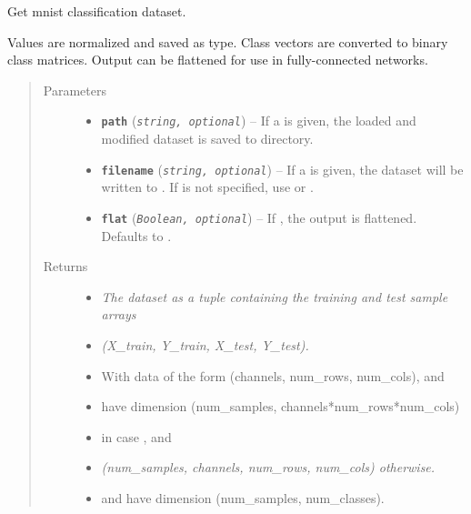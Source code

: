 \documentclass[letterpaper,10pt,english]{sphinxmanual}
\begin{document}
\begin{fulllineitems}
\label{snntoolbox.io_utils:snntoolbox.io_utils.mnist_load.get_mnist}
Get mnist classification dataset.

Values are normalized and saved as  type. Class vectors are
converted to binary class matrices. Output can be flattened for use in
fully-connected networks.
\begin{quote}\begin{description}
\item[{Parameters}] \leavevmode\begin{itemize}
\item {} 
\textbf{\texttt{path}} (\emph{\texttt{string, optional}}) -- If a  is given, the loaded and modified dataset is saved to
 directory.

\item {} 
\textbf{\texttt{filename}} (\emph{\texttt{string, optional}}) -- If a  is given, the dataset will be written to .
If  is not specified, use  or .

\item {} 
\textbf{\texttt{flat}} (\emph{\texttt{Boolean, optional}}) -- If , the output is flattened. Defaults to .

\end{itemize}

\item[{Returns}] \leavevmode
\begin{itemize}
\item {} 
\emph{The dataset as a tuple containing the training and test sample arrays}

\item {} 
\emph{(X\_train, Y\_train, X\_test, Y\_test).}

\item {} 
With data of the form (channels, num\_rows, num\_cols),  and

\item {} 
 have dimension (num\_samples, channels*num\_rows*num\_cols)

\item {} 
in case , and

\item {} 
\emph{(num\_samples, channels, num\_rows, num\_cols) otherwise.}

\item {} 
 and  have dimension (num\_samples, num\_classes).

\end{itemize}


\end{description}\end{quote}

\end{fulllineitems}
\end{document}

